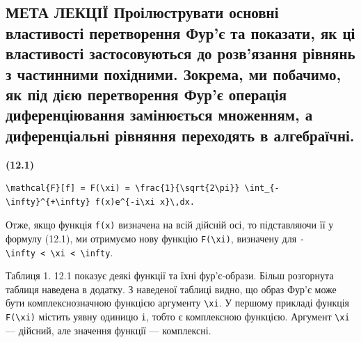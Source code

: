 \documentclass[
  ukrainian,
]{article}
\begin{document}
\subsection{МЕТА ЛЕКЦІЇ Проілюструвати основні властивості перетворення
Фур'є та показати, як ці властивості застосовуються до розв'язання
рівнянь з частинними похідними. Зокрема, ми побачимо, як під дією
перетворення Фур'є операція диференціювання замінюється множенням, а
диференціальні рівняння переходять в
алгебраїчні.}\label{ux43cux435ux442ux430-ux43bux435ux43aux446ux456ux457-ux43fux440ux43eux456ux43bux44eux441ux442ux440ux443ux432ux430ux442ux438-ux43eux441ux43dux43eux432ux43dux456-ux432ux43bux430ux441ux442ux438ux432ux43eux441ux442ux456-ux43fux435ux440ux435ux442ux432ux43eux440ux435ux43dux43dux44f-ux444ux443ux440ux454-ux442ux430-ux43fux43eux43aux430ux437ux430ux442ux438-ux44fux43a-ux446ux456-ux432ux43bux430ux441ux442ux438ux432ux43eux441ux442ux456-ux437ux430ux441ux442ux43eux441ux43eux432ux443ux44eux442ux44cux441ux44f-ux434ux43e-ux440ux43eux437ux432ux44fux437ux430ux43dux43dux44f-ux440ux456ux432ux43dux44fux43dux44c-ux437-ux447ux430ux441ux442ux438ux43dux43dux438ux43cux438-ux43fux43eux445ux456ux434ux43dux438ux43cux438.-ux437ux43eux43aux440ux435ux43cux430-ux43cux438-ux43fux43eux431ux430ux447ux438ux43cux43e-ux44fux43a-ux43fux456ux434-ux434ux456ux454ux44e-ux43fux435ux440ux435ux442ux432ux43eux440ux435ux43dux43dux44f-ux444ux443ux440ux454-ux43eux43fux435ux440ux430ux446ux456ux44f-ux434ux438ux444ux435ux440ux435ux43dux446ux456ux44eux432ux430ux43dux43dux44f-ux437ux430ux43cux456ux43dux44eux454ux442ux44cux441ux44f-ux43cux43dux43eux436ux435ux43dux43dux44fux43c-ux430-ux434ux438ux444ux435ux440ux435ux43dux446ux456ux430ux43bux44cux43dux456-ux440ux456ux432ux43dux44fux43dux43dux44f-ux43fux435ux440ux435ux445ux43eux434ux44fux442ux44c-ux432-ux430ux43bux433ux435ux431ux440ux430ux457ux447ux43dux456.}

\textbf{(12.1)}

\begin{verbatim}
\mathcal{F}[f] = F(\xi) = \frac{1}{\sqrt{2\pi}} \int_{-\infty}^{+\infty} f(x)e^{-i\xi x}\,dx.
\end{verbatim}

Отже, якщо функція \texttt{f(x)} визначена на всій дійсній осі, то
підставляючи її у формулу (12.1), ми отримуємо нову функцію
\texttt{F(\textbackslash{}xi)}, визначену для
\texttt{-\textbackslash{}infty\ \textless{}\ \textbackslash{}xi\ \textless{}\ \textbackslash{}infty}.

Таблиця 1. 12.1 показує деякі функції та їхні фур'є-образи. Більш
розгорнута таблиця наведена в додатку. З наведеної таблиці видно, що
образ Фур'є може бути комплекснозначною функцією аргументу
\texttt{\textbackslash{}xi}. У першому прикладі функція
\texttt{F(\textbackslash{}xi)} містить уявну одиницю \texttt{i}, тобто є
комплексною функцією. Аргумент \texttt{\textbackslash{}xi} --- дійсний,
але значення функції --- комплексні.
\end{document}
